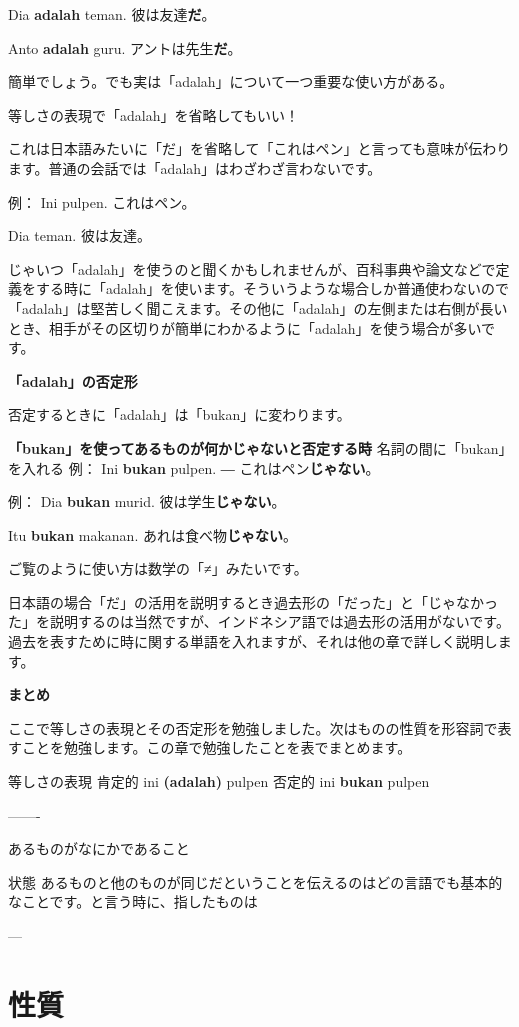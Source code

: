 \documentclass[uplatex]{jsarticle}
\begin{document}
Dia \textbf{adalah} teman.
彼は友達\textbf{だ}。

Anto \textbf{adalah} guru.
アントは先生\textbf{だ}。

簡単でしょう。でも実は「adalah」について一つ重要な使い方がある。

等しさの表現で「adalah」を省略してもいい！

これは日本語みたいに「だ」を省略して「これはペン」と言っても意味が伝わります。普通の会話では「adalah」はわざわざ言わないです。

例：
Ini pulpen.
これはペン。

Dia teman.
彼は友達。

じゃいつ「adalah」を使うのと聞くかもしれませんが、百科事典や論文などで定義をする時に「adalah」を使います。そういうような場合しか普通使わないので「adalah」は堅苦しく聞こえます。その他に「adalah」の左側または右側が長いとき、相手がその区切りが簡単にわかるように「adalah」を使う場合が多いです。

\textbf{「adalah」の否定形}

否定するときに「adalah」は「bukan」に変わります。

\textbf{「bukan」を使ってあるものが何かじゃないと否定する時}
名詞の間に「bukan」を入れる
例： Ini \textbf{bukan} pulpen. ― これはペン\textbf{じゃない}。

例：
Dia \textbf{bukan} murid.
彼は学生\textbf{じゃない}。

Itu \textbf{bukan} makanan.
あれは食べ物\textbf{じゃない}。

ご覧のように使い方は数学の「≠」みたいです。

日本語の場合「だ」の活用を説明するとき過去形の「だった」と「じゃなかった」を説明するのは当然ですが、インドネシア語では過去形の活用がないです。過去を表すために時に関する単語を入れますが、それは他の章で詳しく説明します。

\textbf{まとめ}

ここで等しさの表現とその否定形を勉強しました。次はものの性質を形容詞で表すことを勉強します。この章で勉強したことを表でまとめます。

		等しさの表現
肯定的	ini \textbf{(adalah)} pulpen
否定的	ini \textbf{bukan} pulpen

-------


あるものがなにかであること


状態
あるものと他のものが同じだということを伝えるのはどの言語でも基本的なことです。と言う時に、指したものは

---

\section{性質}
\end{document}
